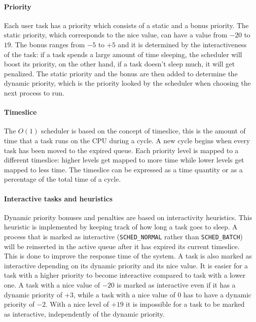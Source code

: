 \paragraph{Priority} %
Each user task has a priority which consists of a static and a bonus priority. The static priority, which corresponds to the nice value, can have a value from $-20$ to $19$. The bonus ranges from $-5$ to $+5$ and it is determined by the interactiveness of the task: if a task spends a large amount of time sleeping, the scheduler will boost its priority, on the other hand, if a task doesn't sleep much, it will get penalized. 
The static priority and the bonus are then added to determine the dynamic priority, which is the priority looked by the scheduler when choosing the next process to run.

\paragraph{Timeslice} %
The $O(1)$ scheduler is based on the concept of timeslice, this is the amount of time that a task runs on the CPU during a cycle. A new cycle begins when every task has been moved to the expired queue. Each priority level is mapped to a different timeslice: higher levels get mapped to more time while lower levels get mapped to less time. The timeslice can be expressed as a time quantity or as a percentage of the total time of a cycle.

\paragraph{Interactive tasks and heuristics} 
Dynamic priority bonuses and penalties are based on interactivity heuristics. This heuristic is implemented by keeping track of how long a task goes to sleep.\cite{O(1)}
A process that is marked as interactive (\verb|SCHED_NORMAL| rather than \verb|SCHED_BATCH|) will be reinserted in the
active queue after it has expired its current timeslice. This is done 
to improve the response time of the system. A task is
also marked as interactive depending on its dynamic priority and its nice
value. It is easier for a task with a higher priority to become interactive compared to task with a lower one. A task with a nice value of $-20$ is marked as interactive
even if it has a dynamic priority of $+3$, while a task with a nice
value of $0$ has to have a dynamic priority of $-2$. With a nice level
of $+19$ it is impossible for a task to be marked as interactive, independently of the dynamic priority. %

